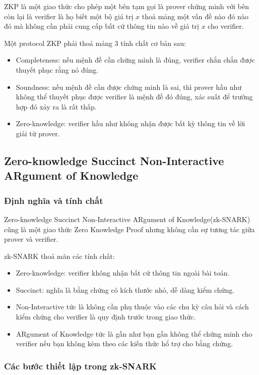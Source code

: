 \documentclass[../thesis.tex]{subfiles}
\begin{document}
ZKP là một giao thức cho phép một bên tạm gọi là prover chứng minh với bên còn lại là verifier là họ biết một bộ giá trị $x$ thoả mảng một vấn đề nào đó nào đó mà không cần phải cung cấp bất cứ thông tin nào về giá trị $x$ cho verifier.

Một protocol ZKP phải thoả mảng 3 tính chất cơ bản sau:

\begin{itemize}
\item Completeness: nếu mệnh đề cần chứng mình là đúng, verifier chắn chắn được thuyết phục rằng nó đúng.
\item Soundness: nếu mệnh đề cần được chứng minh là sai, thì prover hầu như không thể thuyết phục được verifier là mệnh đề đó đúng, xác suất để trường hợp đó xảy ra là rất thấp.
\item Zero-knowledge: verifier hầu như không nhận được bất kỳ thông tin về lời giải từ prover.
\end{itemize}

\subsection{Zero-knowledge Succinct Non-Interactive ARgument of Knowledge}

\subsubsection{Định nghĩa và tính chất}
Zero-knowledge Succinct Non-Interactive ARgument of Knowledge(zk-SNARK) cũng là một giao thức Zero Knowledge Proof nhưng không cần sự tương tác giữa prover và verifier.

zk-SNARK thoả mãn các tính chất:
\begin{itemize}
\item Zero-knowledge: verifier không nhận bất cứ thông tin ngoài bài toán. 
\item Succinct: nghĩa là bằng chứng có kích thước nhỏ, dễ dàng kiểm chứng. 
\item Non-Interactive tức là không cần phụ thuộc vào các chu kỳ câu hỏi và cách kiểm chứng cho verifier là quy định trước trong giao thức. 
\item ARgument of Knowledge tức là gần như bạn gần không thể chứng minh cho verifier nếu bạn không kèm theo các kiến thức hổ trợ cho bằng chứng.
\end{itemize}

\subsubsection{Các bước thiết lập trong zk-SNARK}
\end{document}

